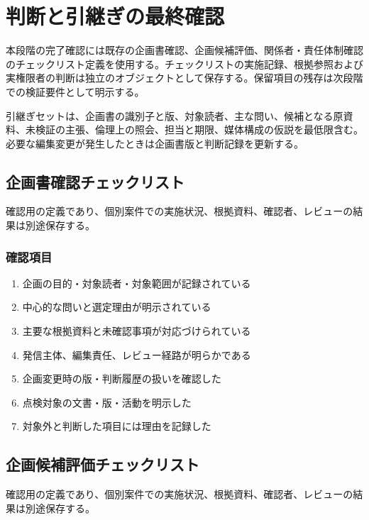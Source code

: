 \documentclass[a4paper,11pt]{article}
\begin{document}
\section{判断と引継ぎの最終確認}
\par 本段階の完了確認には既存の企画書確認、企画候補評価、関係者・責任体制確認のチェックリスト定義を使用する。チェックリストの実施記録、根拠参照および実権限者の判断は独立のオブジェクトとして保存する。保留項目の残存は次段階での検証要件として明示する。\par\medskip
\par 引継ぎセットは、企画書の識別子と版、対象読者、主な問い、候補となる原資料、未検証の主張、倫理上の照会、担当と期限、媒体構成の仮説を最低限含む。必要な編集変更が発生したときは企画書版と判断記録を更新する。\par\medskip
\subsection{企画書確認チェックリスト}
\par 確認用の定義であり、個別案件での実施状況、根拠資料、確認者、レビューの結果は別途保存する。\par\medskip
\subsubsection*{確認項目}
\begin{enumerate}[leftmargin=2em,itemsep=0.3em]
\item 企画の目的・対象読者・対象範囲が記録されている\par
\item 中心的な問いと選定理由が明示されている\par
\item 主要な根拠資料と未確認事項が対応づけられている\par
\item 発信主体、編集責任、レビュー経路が明らかである\par
\item 企画変更時の版・判断履歴の扱いを確認した\par
\item 点検対象の文書・版・活動を明示した\par
\item 対象外と判断した項目には理由を記録した\par
\end{enumerate}
\subsection{企画候補評価チェックリスト}
\par 確認用の定義であり、個別案件での実施状況、根拠資料、確認者、レビューの結果は別途保存する。\par\medskip
\end{document}
